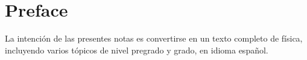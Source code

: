 \chapter*{Preface}

La intención de las presentes notas es convertirse en un texto completo de física, incluyendo varios tópicos de nivel pregrado y grado, en idioma español. 